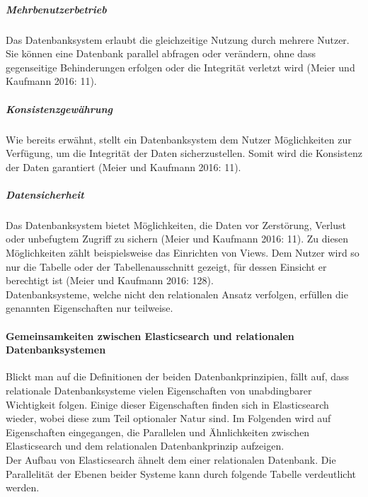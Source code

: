 \documentclass[a4paper]{scrartcl}
\begin{document}
\subparagraph{Mehrbenutzerbetrieb}
Das Datenbanksystem erlaubt die gleichzeitige Nutzung durch mehrere Nutzer. Sie können eine Datenbank parallel abfragen oder verändern, ohne dass gegenseitige Behinderungen erfolgen oder die Integrität verletzt wird (Meier und Kaufmann 2016: 11).

\subparagraph{Konsistenzgewährung}
Wie bereits erwähnt, stellt ein Datenbanksystem dem Nutzer Möglichkeiten zur Verfügung, um die Integrität der Daten sicherzustellen. Somit wird die Konsistenz der Daten garantiert (Meier und Kaufmann 2016: 11).

\subparagraph{Datensicherheit}
Das Datenbanksystem bietet Möglichkeiten, die Daten vor Zerstörung, Verlust oder unbefugtem Zugriff zu sichern (Meier und Kaufmann 2016: 11). Zu diesen Möglichkeiten zählt beispielsweise das Einrichten von Views. Dem Nutzer wird so nur die Tabelle oder der Tabellenausschnitt gezeigt, für dessen Einsicht er berechtigt ist (Meier und Kaufmann 2016: 128). \\ 

Datenbanksysteme, welche nicht den relationalen Ansatz verfolgen, erfüllen die genannten Eigenschaften nur teilweise.

\paragraph{Gemeinsamkeiten zwischen Elasticsearch und relationalen Datenbanksystemen}
Blickt man auf die Definitionen der beiden Datenbankprinzipien, fällt auf, dass relationale Datenbanksysteme vielen Eigenschaften von unabdingbarer Wichtigkeit folgen. Einige dieser Eigenschaften finden sich in Elasticsearch wieder, wobei diese zum Teil optionaler Natur sind. Im Folgenden wird auf Eigenschaften eingegangen, die Parallelen und Ähnlichkeiten zwischen Elasticsearch und dem relationalen Datenbankprinzip aufzeigen. \\

Der Aufbau von Elasticsearch ähnelt dem einer relationalen Datenbank. Die Parallelität der Ebenen beider Systeme kann durch folgende Tabelle verdeutlicht werden.
\end{document}

